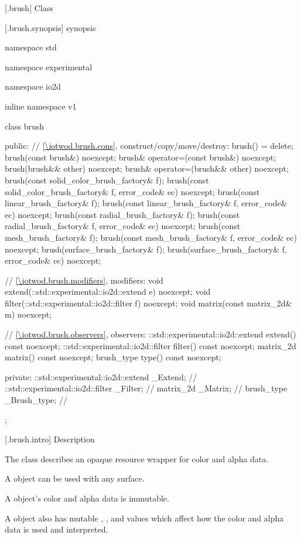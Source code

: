  [\iotwod.brush] {Class }

 [\iotwod.brush.synopsis] { synopsis}

\begin{codeblock}
namespace std { namespace experimental { namespace io2d { inline namespace v1 {
  class brush {
  public:
    // \ref{\iotwod.brush.cons}, construct/copy/move/destroy:
    brush() = delete;
    brush(const brush&) noexcept;
    brush& operator=(const brush&) noexcept;
    brush(brush&& other) noexcept;
    brush& operator=(brush&& other) noexcept;
    brush(const solid_color_brush_factory& f);
    brush(const solid_color_brush_factory& f, error_code& ec) noexcept;
    brush(const linear_brush_factory& f);
    brush(const linear_brush_factory& f, error_code& ec) noexcept;
    brush(const radial_brush_factory& f);
    brush(const radial_brush_factory& f, error_code& ec) noexcept;
    brush(const mesh_brush_factory& f);
    brush(const mesh_brush_factory& f, error_code& ec) noexcept;
    brush(surface_brush_factory& f);
    brush(surface_brush_factory& f, error_code& ec) noexcept;

    // \ref{\iotwod.brush.modifiers}, modifiers:
    void extend(::std::experimental::io2d::extend e) noexcept;
    void filter(::std::experimental::io2d::filter f) noexcept;
    void matrix(const matrix_2d& m) noexcept;

    // \ref{\iotwod.brush.observers}, observers:
    ::std::experimental::io2d::extend extend() const noexcept;
    ::std::experimental::io2d::filter filter() const noexcept;
    matrix_2d matrix() const noexcept;
    brush_type type() const noexcept;

  private:
    ::std::experimental::io2d::extend _Extend; // \expos
    ::std::experimental::io2d::filter _Filter; // \expos
    matrix_2d _Matrix;                         // \expos
    brush_type _Brush_type;                    // \expos
  };
} } } }
\end{codeblock}

 [\iotwod.brush.intro] { Description}

\pnum
{}
The class  describes an opaque resource wrapper for color and alpha data.

\pnum
A  object can be used with any surface.

\pnum
A  object's color and alpha data is immutable.

\pnum
A  object also has mutable , , and  values which affect how the color and alpha data is used and interpreted.

